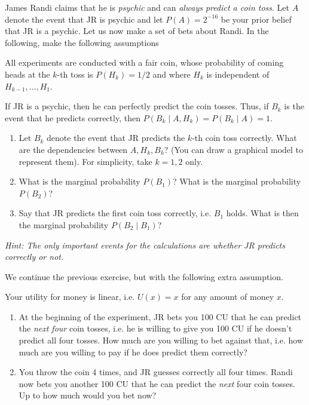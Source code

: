 \documentclass[twoside,a4paper]{article}
\begin{document}
\begin{exercise}
  James Randi claims that he is \emph{psychic} and can \emph{always predict a coin toss}. Let $A$ denote the event that JR is psychic and let $P(A) = 2^{-16}$ be your prior belief that JR is a psychic. Let us now make a set of bets about Randi.
  In the following, make the following assumptions
  \begin{assumption}
    All experiments are conducted with a fair coin, whose probability of coming heads at the $k$-th toss is $P(H_k) = 1/2$ and where $H_k$ is independent of $H_{k-1}, \ldots, H_1$.
  \end{assumption}
  \begin{assumption}
    If JR is a psychic, then he can perfectly predict the coin tosses. Thus, if $B_k$ is the event that he predicts correctly, then $P(B_k \mid A, H_k) = P(B_k \mid A) = 1$.
  \end{assumption}


  
  \begin{enumerate}
  \item Let $B_k$ denote the event that JR predicts the $k$-th coin toss correctly. What are the dependencies between $A, H_k, B_k$? (You can draw a graphical model to represent them). For simplicity, take $k=1, 2$ only.
  \item What is the marginal probability $P(B_1)$? What is the marginal probability $P(B_2)$?  
  \item Say that JR predicts the first coin toss correctly, i.e. $B_1$ holds. What is then the marginal probability $P(B_2 \mid B_1)$? 
  \end{enumerate}
  \emph{Hint: The only important events for the calculations are whether JR predicts correctly or not.}
\end{exercise}


\begin{exercise}
  We continue the previous exercise, but with the following extra assumption.
  \begin{assumption}
    Your utility for money is linear, i.e. $U(x) = x$ for
    any amount of money $x$.
  \end{assumption}     
  \begin{enumerate}  
  \item At the beginning of the experiment, JR bets you 100 CU that he can predict the \emph{next four} coin tosses, i.e. he is willing to give you 100 CU if he doesn't predict all four tosses. How much are you willing to bet against that, i.e. how much are you willing to pay if he does predict them correctly?
  \item You throw the coin 4 times, and JR guesses correctly all four
    times. Randi now bets you another 100 CU that he can predict the
    \emph{next} four coin tosses. Up to how much would you bet now?
  \end{enumerate}
\end{exercise}
\end{document}
